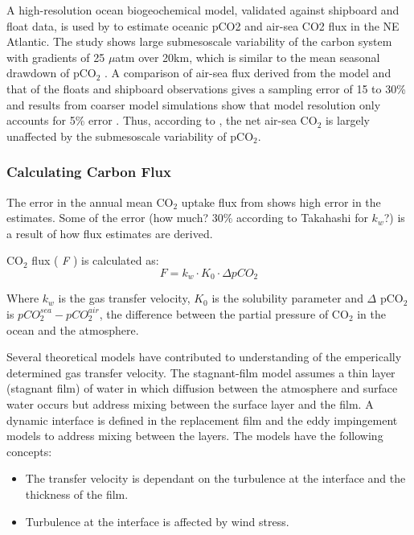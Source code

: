 \documentclass[11pt, a4paper]{article}
\numberwithin{figure}{section}
\numberwithin{table}{section}
\begin{document}
A high-resolution ocean biogeochemical model, validated against shipboard and 
float data,  is used by 
\citet{Resplandy2009} %
to estimate oceanic pCO2 and 
air-sea CO2 flux in the NE Atlantic.
The study shows large submesoscale variability of the carbon system with 
gradients of 25 $\mu$atm over 20km, which is similar to the mean seasonal 
drawdown of pCO$_2$ \citep{Resplandy2009}.%
A comparison of air-sea flux derived from the model and that of the floats 
and shipboard observations gives a sampling error of 15 to 30\% and results 
from coarser model simulations show that model resolution only accounts for 
5\% error \cite{Resplandy2009}.%
Thus, according to 
\citet{Resplandy2009} %
, the net air-sea CO$_2$ is largely 
unaffected by the submesoscale variability of pCO$_2$.

\subsubsection{Calculating Carbon Flux}
The error in the annual mean CO$_2$ uptake flux from 
\citet{Takahashi2009} %
shows high error in the estimates. 
Some of the error (how much? 30\% according to Takahashi for 
$k_w$?) is a result of how flux estimates are derived.

CO$_2$ flux ( {\em F} ) is calculated as:
\begin{equation} 
F = k_{w} \cdot K_{0} \cdot \Delta pCO_2 %
\end{equation}

Where $k_w$ is the gas transfer velocity, $K_0$ is the solubility parameter
and $\Delta$ pCO$_2$ is $pCO_{2}^{sea} - pCO_{2}^{air}$, the difference between
the partial pressure of CO$_2$ in the ocean and the atmosphere. 

Several theoretical models have contributed to understanding of the
emperically determined gas transfer velocity. 
The stagnant-film model 
\citep{LissMerlivat1974, BroekerPeng1974} 
assumes a thin layer (stagnant film) of water in which 
diffusion between the atmosphere and surface water occurs
but address mixing between the surface layer and the film.
A dynamic interface is defined in the replacement film
\citep{Danckwerts1951} 
and the eddy impingement models
\citep{McCreadyHanratty1984}
to address mixing between the layers. 
The models have the following concepts:
\begin{itemize}
\item The transfer velocity is dependant on the turbulence
at the interface and the thickness of the film.
\item Turbulence at the interface is affected by wind stress.
\end{itemize}
\end{document}
